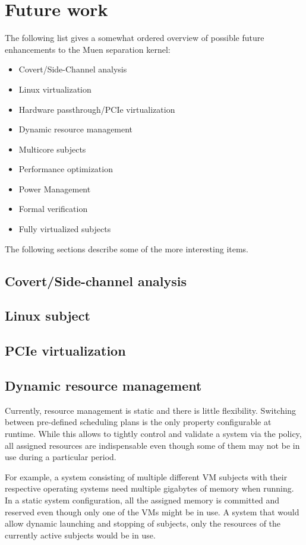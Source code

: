 \section{Future work}

The following list gives a somewhat ordered overview of possible future
enhancements to the Muen separation kernel:

\begin{itemize}
	\item Covert/Side-Channel analysis
	\item Linux virtualization
	\item Hardware passthrough/PCIe virtualization
	\item Dynamic resource management
	\item Multicore subjects
	\item Performance optimization
	\item Power Management
	\item Formal verification
	\item Fully virtualized subjects
\end{itemize}

The following sections describe some of the more interesting items.

\subsection{Covert/Side-channel analysis}

\subsection{Linux subject}

\subsection{PCIe virtualization}

\subsection{Dynamic resource management}
Currently, resource management is static and there is little flexibility.
Switching between pre-defined scheduling plans is the only property
configurable at runtime. While this allows to tightly control and validate a
system via the policy, all assigned resources are indispensable even though some
of them may not be in use during a particular period.

For example, a system consisting of multiple different VM subjects with their
respective operating systems need multiple gigabytes of memory when running.
In a static system configuration, all the assigned memory is committed and
reserved even though only one of the VMs might be in use. A system that would
allow dynamic launching and stopping of subjects, only the resources of the
currently active subjects would be in use.

